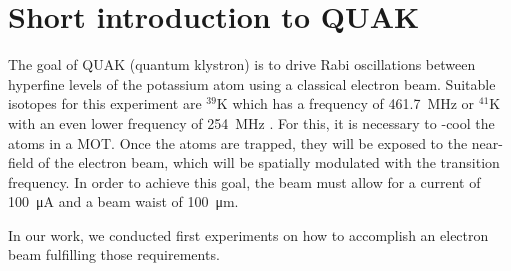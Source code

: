 
\chapter{Short introduction to QUAK}
\label{ch:Short introduction to QuaK}

The goal of QUAK (quantum klystron) is to drive Rabi oscillations between hyperfine levels of the potassium atom using a classical electron beam. Suitable isotopes for this experiment are $^{39}\mathrm{K}$ which has a frequency of \SI{461.7}{\mega\hertz} or $^{41}\mathrm{K}$ with an even lower frequency of \SI{254}{\mega\hertz} \cite{tiecke:potassium-properties}. For this, it is necessary to -cool the atoms in a MOT. Once the atoms are trapped, they will be exposed to the near-field of the electron beam, which will be spatially modulated with the transition frequency. In order to achieve this goal, the beam must allow for a current of \SI{100}{\micro\ampere} and a beam waist of \SI{100}{\micro\meter}.

In our work, we conducted first experiments on how to accomplish an electron beam fulfilling those requirements.